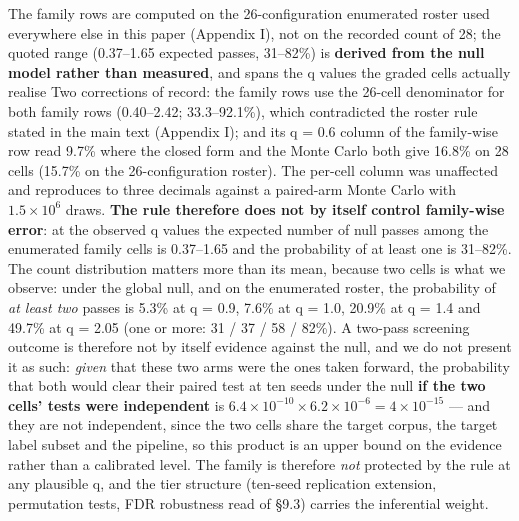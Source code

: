 \documentclass[pdflatex,sn-mathphys-ay]{sn-jnl}
\begin{document}
The family rows are computed on the 26-configuration enumerated roster used everywhere else in this paper (Appendix I), not on the recorded count of 28; the quoted range (0.37--1.65 expected passes, 31--82\%) is \textbf{derived from the null model rather than measured}, and spans the q values the graded cells actually realise Two corrections of record: the family rows use the 26-cell denominator for both family rows (0.40--2.42; 33.3--92.1\%), which contradicted the roster rule stated in the main text (Appendix I); and its q = 0.6 column of the family-wise row read 9.7\% where the closed form and the Monte Carlo both give 16.8\% on 28 cells (15.7\% on the 26-configuration roster). The per-cell column was unaffected and reproduces to three decimals against a paired-arm Monte Carlo with $1.5\times10^6$ draws. \textbf{The rule therefore does not by itself control family-wise error}: at the observed q values the expected number of null passes among the enumerated family cells is 0.37--1.65 and the probability of at least one is 31--82\%. The count distribution matters more than its mean, because two cells is what we observe: under the global null, and on the enumerated roster, the probability of \emph{at least two} passes is 5.3\% at q = 0.9, 7.6\% at q = 1.0, 20.9\% at q = 1.4 and 49.7\% at q = 2.05 (one or more: 31 / 37 / 58 / 82\%). A two-pass screening outcome is therefore not by itself evidence against the null, and we do not present it as such: \emph{given} that these two arms were the ones taken forward, the probability that both would clear their paired test at ten seeds under the null \textbf{if the two cells' tests were independent} is $6.4\times10^{-10} \times 6.2\times10^{-6} = 4\times10^{-15}$ --- and they are not independent, since the two cells share the target corpus, the target label subset and the pipeline, so this product is an upper bound on the evidence rather than a calibrated level. The family is therefore \emph{not} protected by the rule at any plausible q, and the tier structure (ten-seed replication extension, permutation tests, FDR robustness read of \S{}9.3) carries the inferential weight.
\end{document}
